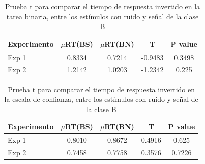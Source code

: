 \begin{table}[h]
\caption[Prueba t para comparar el tiempo de respuesta invertido en la tarea binaria, entre los estímulos con ruido y señal de la clase B]{Prueba t para comparar el tiempo de respuesta invertido en la tarea binaria, entre los estímulos con ruido y señal de la clase B}
\label{Tabla_RT1_B}
\centering
\begin{tabular}{l |  c c c c}
\toprule
\textbf{Experimento} & \textbf{$\mu$RT(BS)} & \textbf{$\mu$RT(BN)} & \textbf{T} & \textbf{P value}\\
\midrule
Exp 1 & 0.8334 & 0.7214 & -0.9483 & 0.3498 \\
Exp 2 & 1.2142 & 1.0203 & -1.2342 & 0.225  \\
\bottomrule
\end{tabular}
\end{table}

\begin{table}[th]
\caption[Prueba t para comparar el tiempo de respuesta invertido en la escala de confianza, entre los estímulos con ruido y señal de la clase B]{Prueba t para comparar el tiempo de respuesta invertido en la escala de confianza, entre los estímulos con ruido y señal de la clase B}
\label{Tabla_RT2_B}
\centering
\begin{tabular}{l |  c c c c}
\toprule
\textbf{Experimento} & \textbf{$\mu$RT(BS)} & \textbf{$\mu$RT(BN)} & \textbf{T} & \textbf{P value}\\
\midrule
Exp 1 & 0.8010 & 0.8672 & 0.4916 & 0.625 \\
Exp 2 & 0.7458 & 0.7758 & 0.3576 & 0.7226  \\
\bottomrule
\end{tabular}
\end{table}
